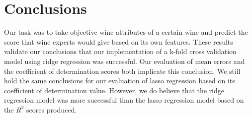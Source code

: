 
\section{Conclusions}
\label{sec:concl}

Our task was to take objective wine attributes of a certain wine and predict the
score that wine experts would give based on its own features. These results 
validate our conclusions that
our implementation of a k-fold cross validation model using ridge regression was
successful. Our evaluation of mean errors and the coefficient of determination scores
both implicate this conclusion. We still hold the same conclusions for our evaluation of lasso regression
based on its coefficient of determination value. However, we do believe that
the ridge regression model was more successful than the lasso regression model
based on the $R^{2}$ scores produced.
